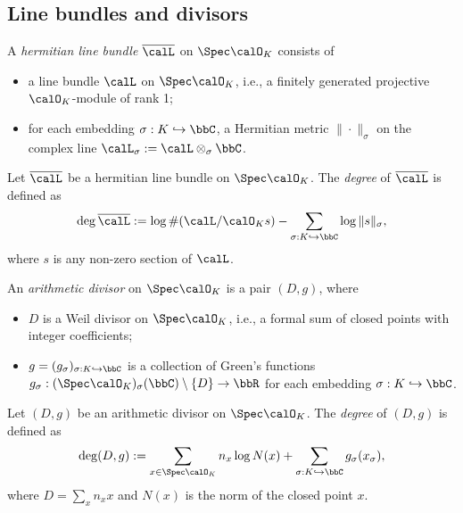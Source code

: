 \subsection{Line bundles and divisors}

    \begin{definition}\label{def:hermitian_line_bundle_on_rings_of_integers}
        A \emph{hermitian line bundle} \(\overline{\calL}\) on \(\Spec \calO_K\) consists of
        \begin{itemize}
            \item a line bundle \(\calL\) on \(\Spec \calO_K\), i.e., a finitely generated projective \(\calO_K\)-module of rank 1;
            \item for each embedding \(\sigma: K \hookrightarrow \bbC\), a Hermitian metric \(\|\cdot\|_\sigma\) on the complex line \(\calL_\sigma := \calL \otimes_{\sigma} \bbC\).
        \end{itemize}
    \end{definition}

    \begin{definition}\label{def:arithmetic_degree_of_hermitian_line_bundles}
        Let \(\overline{\calL}\) be a hermitian line bundle on \(\Spec \calO_K\). 
        The \emph{degree} of \(\overline{\calL}\) is defined as
        \[
            \deg \overline{\calL} := \log \#(\calL / \calO_K s) - \sum_{\sigma: K \hookrightarrow \bbC} \log \|s\|_\sigma,
        \]
        where \(s\) is any non-zero section of \(\calL\).
    \end{definition}

    \begin{definition}\label{def:arithmetic_divisor}
        An \emph{arithmetic divisor} on \(\Spec \calO_K\) is a pair \((D, g)\), where
        \begin{itemize}
            \item \(D\) is a Weil divisor on \(\Spec \calO_K\), i.e., a formal sum of closed points with integer coefficients;
            \item \(g = (g_\sigma)_{\sigma: K \hookrightarrow \bbC}\) is a collection of Green's functions \(g_\sigma: (\Spec \calO_K)_\sigma(\bbC) \setminus \{D\} \to \bbR\) for each embedding \(\sigma: K \hookrightarrow \bbC\).
        \end{itemize}
    \end{definition}


    \begin{definition}\label{def:arithmetic_degree_of_arithmetic_divisors}
        Let \((D, g)\) be an arithmetic divisor on \(\Spec \calO_K\). 
        The \emph{degree} of \((D, g)\) is defined as
        \[
            \deg (D, g) := \sum_{x \in \Spec \calO_K} n_x \log N(x) + \sum_{\sigma: K \hookrightarrow \bbC} g_\sigma(x_\sigma),
        \]
        where \(D = \sum_{x} n_x x\) and \(N(x)\) is the norm of the closed point \(x\).
    \end{definition}

